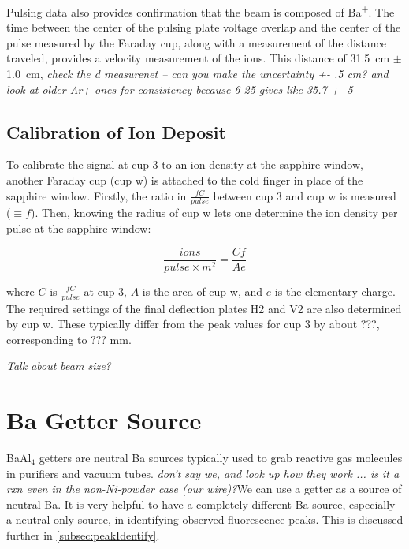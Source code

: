 Pulsing data also provides confirmation that the beam is composed of Ba\textsuperscript{+}.  The time between the center of the pulsing plate voltage overlap and the center of the pulse measured by the Faraday cup, along with a measurement of the distance traveled, provides a velocity measurement of the ions.  This distance of 31.5~cm $\pm$ 1.0~cm, \emph{\color{red}check the d measurenet -- can you make the uncertainty +- .5 cm?  and look at older Ar+ ones  for consistency because 6-25 gives like 35.7 +- 5}

\subsection{Calibration of Ion Deposit}
\label{subsec:ionDepCal}

To calibrate the signal at cup 3 to an ion density at the sapphire window, another Faraday cup (cup w) is attached to the cold finger in place of the sapphire window.  Firstly, the ratio in $\frac{fC}{pulse}$ between cup 3 and cup w is measured ($\equiv f$).  Then, knowing the radius of cup w lets one determine the ion density per pulse at the sapphire window:

\begin{equation}
\frac{ions}{pulse \times m^{2}} = \frac{C f}{A e}
\label{eqn:ion_density}
\end{equation}

\noindent
where $C$ is $\frac{fC}{pulse}$ at cup 3, $A$ is the area of cup w, and $e$ is the elementary charge.  The required settings of the final deflection plates H2 and V2 are also determined by cup w.  These typically differ from the peak values for cup 3 by about ???, corresponding to ??? mm.

{\color{gray}\emph{Talk about beam size?}}

\section{Ba Getter Source}

BaAl$_{4}$ getters are neutral Ba sources typically used to grab reactive gas molecules in purifiers and vacuum tubes.  \emph{\color{red}don't say we, and look up how they work ... is it a rxn even in the non-Ni-powder case (our wire)?}We can use a getter as a source of neutral Ba.  It is very helpful to have a completely different Ba source, especially a neutral-only source, in identifying observed fluorescence peaks.  This is discussed further in \ref{subsec:peakIdentify}.

